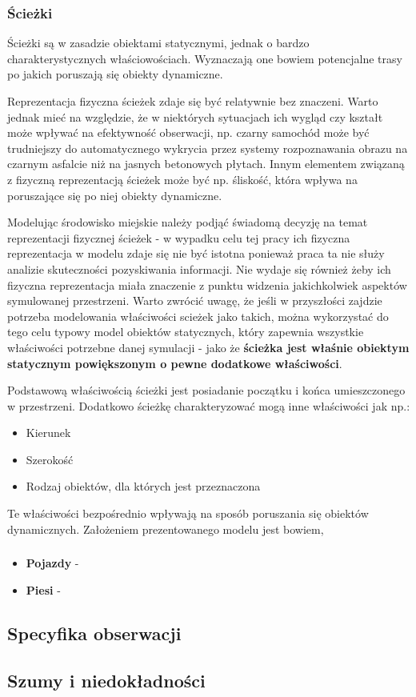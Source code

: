 \subsubsection{Ścieżki}
\par{
Ścieżki są w zasadzie obiektami statycznymi, jednak o bardzo charakterystycznych właściowościach. Wyznaczają one bowiem potencjalne trasy po jakich poruszają się obiekty dynamiczne.
}
\par{
Reprezentacja fizyczna ścieżek zdaje się być relatywnie bez znaczeni. Warto jednak mieć na względzie, że w niektórych sytuacjach ich wygląd czy kształt może wpływać na efektywność obserwacji, np. czarny samochód może być trudniejszy do automatycznego wykrycia przez systemy rozpoznawania obrazu na czarnym asfalcie niż na jasnych betonowych płytach. Innym elementem związaną z fizyczną reprezentacją ścieżek może być np. śliskość, która wpływa na poruszające się po niej obiekty dynamiczne.
}
\par{
Modelując środowisko miejskie należy podjąć świadomą decyzję na temat reprezentacji fizycznej ścieżek - w wypadku celu tej pracy ich fizyczna reprezentacja w modelu zdaje się nie być istotna ponieważ praca ta nie służy analizie skuteczności pozyskiwania informacji. Nie wydaje się również żeby ich fizyczna reprezentacja miała znaczenie z punktu widzenia jakichkolwiek aspektów symulowanej przestrzeni. Warto zwrócić uwagę, że jeśli w przyszłości zajdzie potrzeba modelowania właściwości scieżek jako takich, można wykorzystać do tego celu typowy model obiektów statycznych, który zapewnia wszystkie właściwości potrzebne danej symulacji - jako że \textbf{ścieżka jest właśnie obiektym statycznym powiększonym o pewne dodatkowe właściwości}.
}
\par{
Podstawową właściwością ścieżki jest posiadanie początku i końca umieszczonego w przestrzeni. Dodatkowo ścieżkę charakteryzować mogą inne właściwości jak np.:
\begin{itemize}
\item Kierunek
\item Szerokość
\item Rodzaj obiektów, dla których jest przeznaczona
\end{itemize}
}
Te właściwości bezpośrednio wpływają na sposób poruszania się obiektów dynamicznych. Założeniem prezentowanego modelu jest bowiem, 
\subsubsection{}
\begin{itemize}
\item \textbf{Pojazdy} - 
\item \textbf{Piesi} - 
\end{itemize}



\subsection{Specyfika obserwacji}
\subsection{Szumy i niedokładności}
